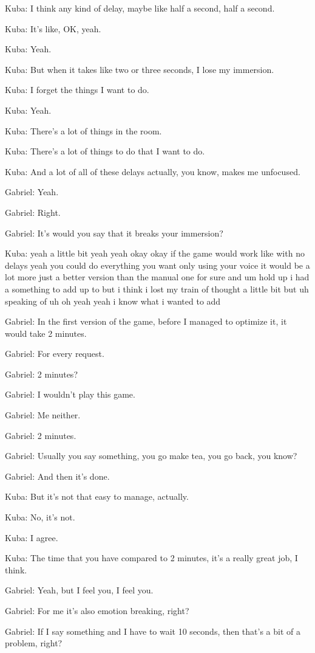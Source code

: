 Kuba: I think any kind of delay, maybe like half a second, half a second.

Kuba: It's like, OK, yeah.

Kuba: Yeah.

Kuba: But when it takes like two or three seconds, I lose my immersion.

Kuba: I forget the things I want to do.

Kuba: Yeah.

Kuba: There's a lot of things in the room.

Kuba: There's a lot of things to do that I want to do.

Kuba: And a lot of all of these delays actually, you know, makes me unfocused.

Gabriel: Yeah.

Gabriel: Right.

Gabriel: It's would you say that it breaks your immersion?

Kuba: yeah a little bit yeah yeah okay okay if the game would work like with no delays yeah you could do everything you want only using your voice it would be a lot more just a better version than the manual one for sure and um hold up i had a something to add up to but i think i lost my train of thought a little bit but uh speaking of uh oh yeah yeah i know what i wanted to add

Gabriel: In the first version of the game, before I managed to optimize it, it would take 2 minutes.

Gabriel: For every request.

Gabriel: 2 minutes?

Gabriel: I wouldn't play this game.

Gabriel: Me neither.

Gabriel: 2 minutes.

Gabriel: Usually you say something, you go make tea, you go back, you know?

Gabriel: And then it's done.

Kuba: But it's not that easy to manage, actually.

Kuba: No, it's not.

Kuba: I agree.

Kuba: The time that you have compared to 2 minutes, it's a really great job, I think.

Gabriel: Yeah, but I feel you, I feel you.

Gabriel: For me it's also emotion breaking, right?

Gabriel: If I say something and I have to wait 10 seconds, then that's a bit of a problem, right?

